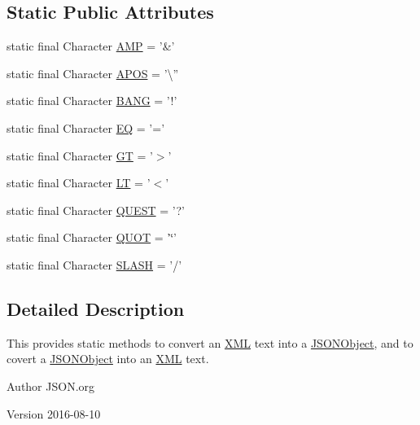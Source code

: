 \subsection*{Static Public Attributes}
\begin{DoxyCompactItemize}
\item 
static final Character \hyperlink{classorg_1_1json_1_1XML_a2ed9b74a6dcc1a3833460cb35b72a8e2}{A\-M\-P} = '\&'
\item 
static final Character \hyperlink{classorg_1_1json_1_1XML_afc1bccac3be808ee0cc80e6c5261226a}{A\-P\-O\-S} = '\textbackslash{}''
\item 
static final Character \hyperlink{classorg_1_1json_1_1XML_a15eadac312b9e5b2d8590be2d92cc24f}{B\-A\-N\-G} = '!'
\item 
static final Character \hyperlink{classorg_1_1json_1_1XML_a79c30d409011e7c5bbffe3a9dd487b19}{E\-Q} = '='
\item 
static final Character \hyperlink{classorg_1_1json_1_1XML_a0a9f1aaef15f78d43c532e601546a722}{G\-T} = '$>$'
\item 
static final Character \hyperlink{classorg_1_1json_1_1XML_a12c351d05c7c78c4730d1ec44ae6b798}{L\-T} = '$<$'
\item 
static final Character \hyperlink{classorg_1_1json_1_1XML_a6ee91c7c64c44b62b197a69b00ee383f}{Q\-U\-E\-S\-T} = '?'
\item 
static final Character \hyperlink{classorg_1_1json_1_1XML_a4a8e56f228505f24fd24b70914d5078c}{Q\-U\-O\-T} = '\char`\"{}'
\item 
static final Character \hyperlink{classorg_1_1json_1_1XML_aaa9a255bc94655b02d65b2c8525e5188}{S\-L\-A\-S\-H} = '/'
\end{DoxyCompactItemize}


\subsection{Detailed Description}
This provides static methods to convert an \hyperlink{classorg_1_1json_1_1XML}{X\-M\-L} text into a \hyperlink{classorg_1_1json_1_1JSONObject}{J\-S\-O\-N\-Object}, and to covert a \hyperlink{classorg_1_1json_1_1JSONObject}{J\-S\-O\-N\-Object} into an \hyperlink{classorg_1_1json_1_1XML}{X\-M\-L} text.

\begin{DoxyAuthor}{Author}
J\-S\-O\-N.\-org 
\end{DoxyAuthor}
\begin{DoxyVersion}{Version}
2016-\/08-\/10 
\end{DoxyVersion}


